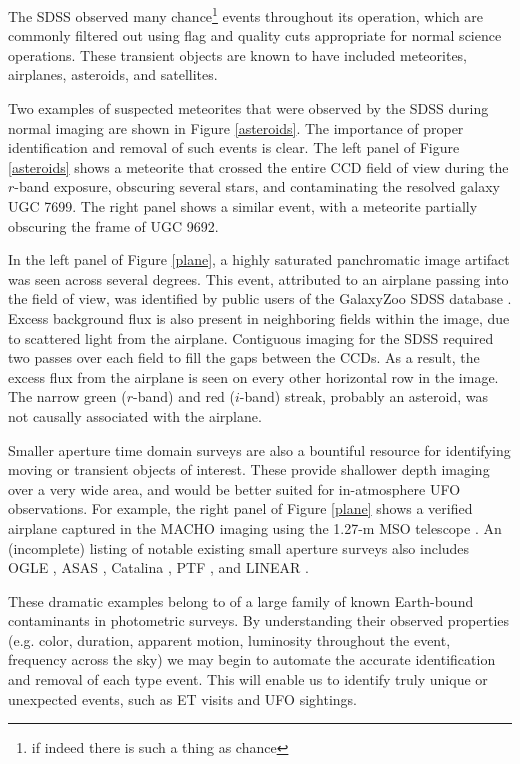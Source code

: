 \documentclass[iop]{emulateapj}
\begin{document}
The SDSS observed many chance\footnote{if indeed there is such a thing as chance} events throughout its operation, which are commonly filtered out using flag and quality cuts appropriate for normal science operations. These transient objects are known to have included meteorites, airplanes, asteroids, and satellites. 

Two examples of suspected meteorites that were observed by the SDSS during normal imaging are shown in Figure \ref{asteroids}. The importance of proper identification and removal of such events is clear. The left panel of Figure \ref{asteroids} shows a meteorite that crossed the entire CCD field of view during the $r$-band exposure, obscuring several stars, and contaminating the resolved galaxy UGC 7699. The right panel shows a similar event, with a meteorite partially obscuring the frame of UGC 9692. 

In the left panel of Figure \ref{plane}, a highly saturated panchromatic image artifact was seen across several degrees. This event, attributed to an airplane passing into the field of view, was identified by public users of the GalaxyZoo SDSS database \citep{galaxyzoo}. Excess background flux is also present in neighboring fields within the image, due to scattered light from the airplane. Contiguous imaging for the SDSS required two passes over each field to fill the gaps between the CCDs. As a result, the excess flux from the airplane is seen on every other horizontal row in the image. The narrow green ($r$-band) and red ($i$-band) streak, probably an asteroid, was not causally associated with the airplane. 

Smaller aperture time domain surveys are also a bountiful resource for identifying moving or transient objects of interest. These provide shallower depth imaging over a very wide area, and would be better suited for in-atmosphere UFO observations. For example, the right panel of Figure \ref{plane} shows a verified airplane captured in the MACHO imaging using the 1.27-m MSO telescope \citep{macho}. An (incomplete) listing of notable existing small aperture surveys also includes OGLE \citep{ogle}, ASAS \citep{asas}, Catalina \citep{catalina}, PTF \citep{ptf}, and LINEAR \citep{linear}.  

These dramatic examples belong to of a large family of known Earth-bound contaminants in photometric surveys. By understanding their observed properties (e.g. color, duration, apparent motion, luminosity throughout the event, frequency across the sky) we may begin to automate the accurate identification and removal of each type event. This will enable us to identify truly unique or unexpected events, such as ET visits and UFO sightings.
\end{document}
